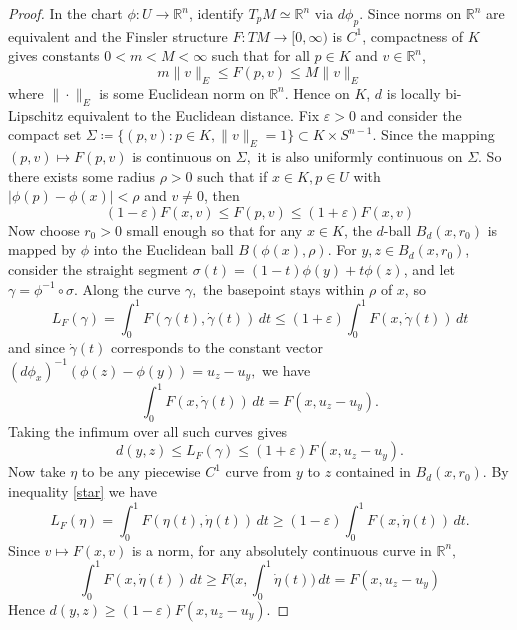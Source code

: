 \documentclass[letterpaper, 11pt, reqno]{amsart}
\theoremstyle{definition}
\begin{document}
\begin{proof}
    In the chart $\phi: U \rightarrow \mathbb{R}^n$, identify $T_pM \simeq \mathbb{R}^n$ via $d\phi_p$. Since norms on $\mathbb{R}^n$ are equivalent and the Finsler structure $F: TM \rightarrow [0, \infty)$ is $C^1$, compactness of $K$ gives constants $0 < m < M < 
    \infty$ such that for all $p \in K$ and $v \in \mathbb{R}^n$,
    \begin{equation}
        m\|v\|_E \leq F(p,v) \leq M\|v\|_E
    \end{equation}
    where $\|\cdot \|_E$ is some Euclidean norm on $\mathbb{R}^n$. Hence on $K$, $d$ is locally bi-Lipschitz equivalent to the Euclidean distance.
    Fix $\varepsilon > 0$ and consider the compact set $\Sigma \coloneq \{(p,v): p \in K, \|v\|_E = 1\} \subset K \times S^{n-1}$. Since the mapping $(p,v) \longmapsto F(p,v)$ is continuous on $\Sigma,$ it is also uniformly continuous on $\Sigma$. So there exists some radius $\rho > 0$ such that if $x\in K, p\in U$ with $|\phi(p)-\phi(x)|<\rho$ and $v \neq 0$, then
    \begin{equation}\label{star}
        (1-\varepsilon)F(x,v) \leq F(p,v) \leq (1+\varepsilon)F(x,v)
    \end{equation}
    Now choose $r_0>0$ small enough so that for any $x\in K$, the $d$-ball $B_d(x,r_0)$ is mapped by $\phi$ into the Euclidean ball $B(\phi(x),\rho)$. For $y,z\in B_d(x,r_0)$, consider the straight segment $\sigma(t) = (1-t)\phi(y)+t\phi(z)$, and let $\gamma = \phi^{-1}\circ \sigma.$ Along the curve $\gamma,$ the basepoint stays within $\rho$ of $x$, so
    \begin{equation}
        L_F(\gamma) = \int_{0}^{1} F(\gamma(t),\dot{\gamma}(t)) \,dt \leq (1+\varepsilon)\int_{0}^{1} F(x,\dot{\gamma}(t)) \,dt
    \end{equation}
    and since $\dot{\gamma}(t)$ corresponds to the constant vector $(d\phi_x)^{-1}(\phi(z)-\phi(y))=u_z-u_y,$ we have
    \begin{equation}
        \int_{0}^{1} F(x,\dot{\gamma}(t)) \,dt =F(x,u_z-u_y).
    \end{equation}
    Taking the infimum over all such curves gives
    \begin{equation}
        d(y,z)\leq L_F(\gamma) \leq (1+\varepsilon)F(x,u_z-u_y).
    \end{equation}
    Now take $\eta$ to be any piecewise $C^1$ curve from $y$ to $z$ contained in $B_d(x,r_0).$ By inequality \ref{star} we have
    \begin{equation}
        L_F(\eta) = \int_{0}^{1} F(\eta(t),\dot{\eta}(t)) \,dt \geq (1-\varepsilon)\int_{0}^{1} F(x,\dot{\eta}(t)) \,dt.
    \end{equation}
    Since $v \longmapsto F(x,v)$ is a norm, for any absolutely continuous curve in $\mathbb{R}^n,$
    \begin{equation}
        \int_{0}^{1} F(x,\dot{\eta}(t)) \,dt \geq F\bigg(x, \int_{0}^{1} \dot{\eta}(t)\bigg) \,dt = F(x,u_z-u_y)
    \end{equation}
    Hence $d(y,z) \geq (1-\varepsilon)F(x,u_z-u_y)$.
\end{proof}
\end{document}
